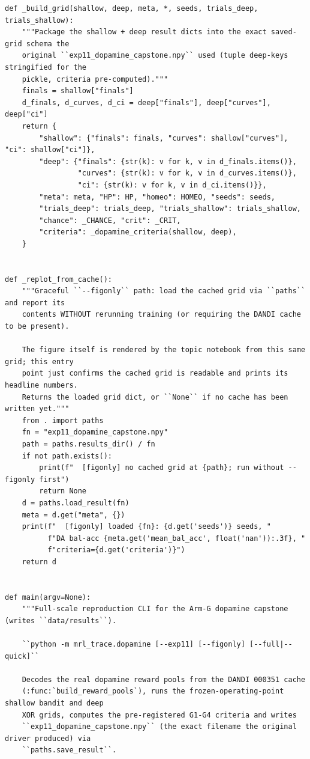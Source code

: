 \begin{lstlisting}[caption={mrl\_trace/dopamine.py},label={lst:siox-src-dopamine}]
def _build_grid(shallow, deep, meta, *, seeds, trials_deep, trials_shallow):
    """Package the shallow + deep result dicts into the exact saved-grid schema the
    original ``exp11_dopamine_capstone.npy`` used (tuple deep-keys stringified for the
    pickle, criteria pre-computed)."""
    finals = shallow["finals"]
    d_finals, d_curves, d_ci = deep["finals"], deep["curves"], deep["ci"]
    return {
        "shallow": {"finals": finals, "curves": shallow["curves"], "ci": shallow["ci"]},
        "deep": {"finals": {str(k): v for k, v in d_finals.items()},
                 "curves": {str(k): v for k, v in d_curves.items()},
                 "ci": {str(k): v for k, v in d_ci.items()}},
        "meta": meta, "HP": HP, "homeo": HOMEO, "seeds": seeds,
        "trials_deep": trials_deep, "trials_shallow": trials_shallow,
        "chance": _CHANCE, "crit": _CRIT,
        "criteria": _dopamine_criteria(shallow, deep),
    }


def _replot_from_cache():
    """Graceful ``--figonly`` path: load the cached grid via ``paths`` and report its
    contents WITHOUT rerunning training (or requiring the DANDI cache to be present).

    The figure itself is rendered by the topic notebook from this same grid; this entry
    point just confirms the cached grid is readable and prints its headline numbers.
    Returns the loaded grid dict, or ``None`` if no cache has been written yet."""
    from . import paths
    fn = "exp11_dopamine_capstone.npy"
    path = paths.results_dir() / fn
    if not path.exists():
        print(f"  [figonly] no cached grid at {path}; run without --figonly first")
        return None
    d = paths.load_result(fn)
    meta = d.get("meta", {})
    print(f"  [figonly] loaded {fn}: {d.get('seeds')} seeds, "
          f"DA bal-acc {meta.get('mean_bal_acc', float('nan')):.3f}, "
          f"criteria={d.get('criteria')}")
    return d


def main(argv=None):
    """Full-scale reproduction CLI for the Arm-G dopamine capstone (writes ``data/results``).

    ``python -m mrl_trace.dopamine [--exp11] [--figonly] [--full|--quick]``

    Decodes the real dopamine reward pools from the DANDI 000351 cache
    (:func:`build_reward_pools`), runs the frozen-operating-point shallow bandit and deep
    XOR grids, computes the pre-registered G1-G4 criteria and writes
    ``exp11_dopamine_capstone.npy`` (the exact filename the original driver produced) via
    ``paths.save_result``.


\end{lstlisting}
